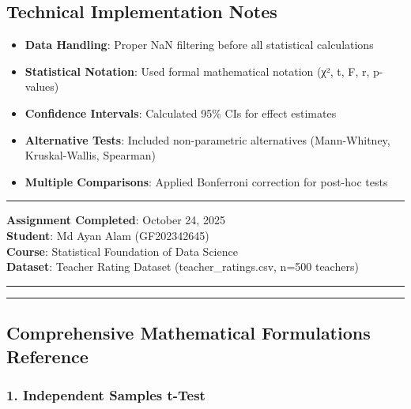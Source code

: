 \documentclass[11pt]{article}
\providecommand{\tightlist}{%
      \setlength{\itemsep}{0pt}\setlength{\parskip}{0pt}}
\begin{document}
\subsection{Technical Implementation
Notes}\label{technical-implementation-notes}

\begin{itemize}
\tightlist
\item
  \textbf{Data Handling}: Proper NaN filtering before all statistical
  calculations
\item
  \textbf{Statistical Notation}: Used formal mathematical notation (χ²,
  t, F, r, p-values)
\item
  \textbf{Confidence Intervals}: Calculated 95\% CIs for effect
  estimates
\item
  \textbf{Alternative Tests}: Included non-parametric alternatives
  (Mann-Whitney, Kruskal-Wallis, Spearman)
\item
  \textbf{Multiple Comparisons}: Applied Bonferroni correction for
  post-hoc tests
\end{itemize}

\begin{center}\rule{0.5\linewidth}{0.5pt}\end{center}

\textbf{Assignment Completed}: October 24, 2025\\
\textbf{Student}: Md Ayan Alam (GF202342645)\\
\textbf{Course}: Statistical Foundation of Data Science\\
\textbf{Dataset}: Teacher Rating Dataset (teacher\_ratings.csv, n=500
teachers)

\begin{center}\rule{0.5\linewidth}{0.5pt}\end{center}

    \begin{center}\rule{0.5\linewidth}{0.5pt}\end{center}

\subsection{\texorpdfstring{\textbf{Comprehensive Mathematical
Formulations
Reference}}{Comprehensive Mathematical Formulations Reference}}\label{comprehensive-mathematical-formulations-reference}

\subsubsection{\texorpdfstring{\textbf{1. Independent Samples
t-Test}}{1. Independent Samples t-Test}}\label{independent-samples-t-test}
\end{document}
